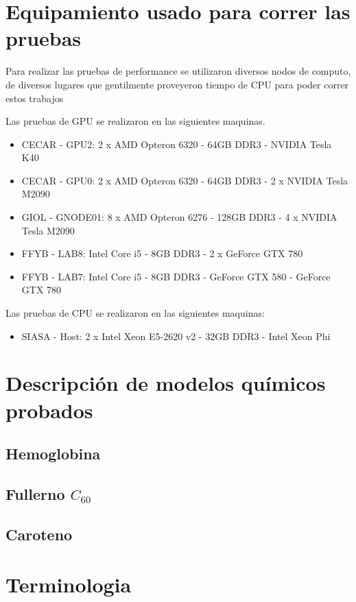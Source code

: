 \chapter{Equipamiento usado para correr las pruebas}

Para realizar las pruebas de performance se utilizaron diversos nodos de computo, de diversos lugares que
gentilmente proveyeron tiempo de CPU para poder correr estos trabajos

Las pruebas de GPU se realizaron en las siguientes maquinas.
\begin{itemize}
  \item CECAR - GPU2: 2 x AMD Opteron 6320 - 64GB DDR3 - NVIDIA Tesla K40
  \item CECAR - GPU0: 2 x AMD Opteron 6320 - 64GB DDR3 - 2 x NVIDIA Tesla M2090
  \item GIOL - GNODE01: 8 x AMD Opteron 6276 - 128GB DDR3 - 4 x NVIDIA Tesla M2090
  \item FFYB - LAB8: Intel Core i5 - 8GB DDR3 - 2 x GeForce GTX 780
  \item FFYB - LAB7: Intel Core i5 - 8GB DDR3 - GeForce GTX 580 - GeForce GTX 780
\end{itemize}

Las pruebas de CPU se realizaron en las siguientes maquinas:
\begin{itemize}
  \item SIASA - Host: 2 x Intel Xeon E5-2620 v2 - 32GB DDR3 - Intel Xeon Phi
\end{itemize}

\chapter{Descripci\'on de modelos qu\'imicos probados}
\section*{Hemoglobina}
\section*{Fullerno $C_{60}$}
\section*{Caroteno}
\chapter{Terminologia}
